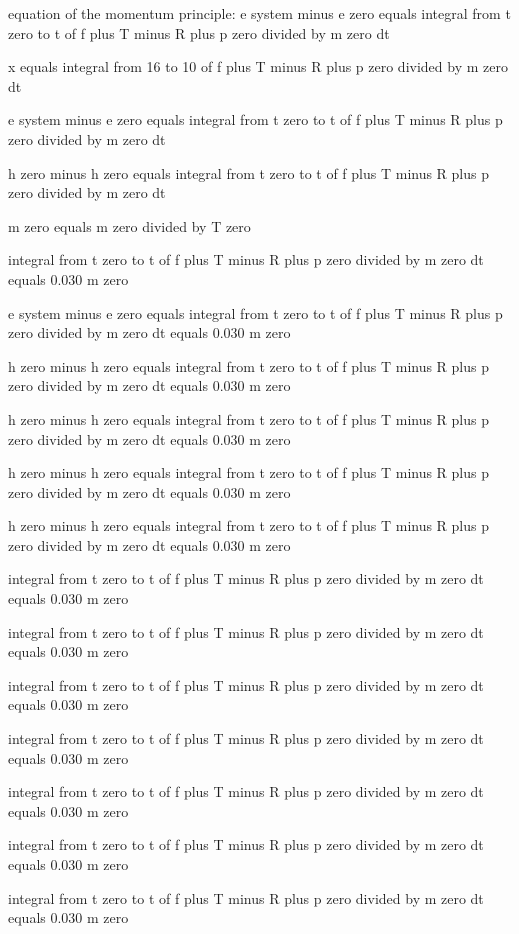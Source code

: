 equation of the momentum principle:
e system minus e zero equals integral from t zero to t of f plus T minus R plus p zero divided by m zero dt

x equals integral from 16 to 10 of f plus T minus R plus p zero divided by m zero dt

e system minus e zero equals integral from t zero to t of f plus T minus R plus p zero divided by m zero dt

h zero minus h zero equals integral from t zero to t of f plus T minus R plus p zero divided by m zero dt

m zero equals m zero divided by T zero

integral from t zero to t of f plus T minus R plus p zero divided by m zero dt equals 0.030 m zero

e system minus e zero equals integral from t zero to t of f plus T minus R plus p zero divided by m zero dt equals 0.030 m zero

h zero minus h zero equals integral from t zero to t of f plus T minus R plus p zero divided by m zero dt equals 0.030 m zero

h zero minus h zero equals integral from t zero to t of f plus T minus R plus p zero divided by m zero dt equals 0.030 m zero

h zero minus h zero equals integral from t zero to t of f plus T minus R plus p zero divided by m zero dt equals 0.030 m zero

h zero minus h zero equals integral from t zero to t of f plus T minus R plus p zero divided by m zero dt equals 0.030 m zero

integral from t zero to t of f plus T minus R plus p zero divided by m zero dt equals 0.030 m zero

integral from t zero to t of f plus T minus R plus p zero divided by m zero dt equals 0.030 m zero

integral from t zero to t of f plus T minus R plus p zero divided by m zero dt equals 0.030 m zero

integral from t zero to t of f plus T minus R plus p zero divided by m zero dt equals 0.030 m zero

integral from t zero to t of f plus T minus R plus p zero divided by m zero dt equals 0.030 m zero

integral from t zero to t of f plus T minus R plus p zero divided by m zero dt equals 0.030 m zero

integral from t zero to t of f plus T minus R plus p zero divided by m zero dt equals 0.030 m zero

